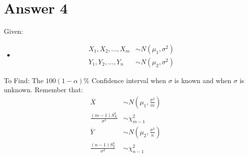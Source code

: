 \documentclass[a4paper]{article}
\begin{document}
\section{Answer 4}
Given:
\begin{itemize}
	\item {
		\begin{equation*}
			\begin{split}
				X_1,X_2,\dots,X_m &\sim N\left( \mu_1,\sigma^2 \right) \\
				Y_1,Y_2,\dots,Y_n &\sim N\left( \mu_2,\sigma^2 \right) 
			\end{split}
		\end{equation*}
		}
\end{itemize}
To Find: The $100\left( 1-\alpha \right) \%$ Confidence interval when $\sigma$ is known and when  $\sigma$ is unknown.
\newline\newline
Remember that:
\begin{equation*}
	\begin{split}
		\overline{X} &\sim N\left( \mu_1, \frac{\sigma^2}{m} \right)\\
		\frac{\left( m-1 \right) S_X^2}{\sigma^2} &\sim \chi^2_{m-1}\\
		\overline{Y} &\sim N\left( \mu_2,\frac{\sigma^2}{n} \right) \\
		\frac{\left( n-1 \right) S_Y^2}{\sigma^2} &\sim \chi^2_{n-1}
		\end{split}
\end{equation*}
\end{document}
